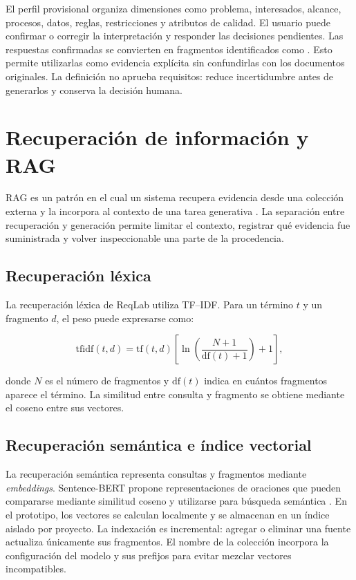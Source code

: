 El perfil provisional organiza dimensiones como problema, interesados, alcance, procesos, datos, reglas, restricciones y atributos de calidad. El usuario puede confirmar o corregir la interpretación y responder las decisiones pendientes. Las respuestas confirmadas se convierten en fragmentos identificados como . Esto permite utilizarlas como evidencia explícita sin confundirlas con los documentos originales. La definición no aprueba requisitos: reduce incertidumbre antes de generarlos y conserva la decisión humana.

\section{Recuperación de información y RAG}

RAG es un patrón en el cual un sistema recupera evidencia desde una colección externa y la incorpora al contexto de una tarea generativa \cite{lewis2020}. La separación entre recuperación y generación permite limitar el contexto, registrar qué evidencia fue suministrada y volver inspeccionable una parte de la procedencia.

\subsection{Recuperación léxica}

La recuperación léxica de ReqLab utiliza TF--IDF. Para un término \(t\) y un fragmento \(d\), el peso puede expresarse como:

\begin{equation}
  \mathrm{tfidf}(t,d)=\mathrm{tf}(t,d)
  \left[\ln\left(\frac{N+1}{\mathrm{df}(t)+1}\right)+1\right],
\end{equation}

donde \(N\) es el número de fragmentos y \(\mathrm{df}(t)\) indica en cuántos fragmentos aparece el término. La similitud entre consulta y fragmento se obtiene mediante el coseno entre sus vectores.

\subsection{Recuperación semántica e índice vectorial}

La recuperación semántica representa consultas y fragmentos mediante \emph{embeddings}. Sentence-BERT propone representaciones de oraciones que pueden compararse mediante similitud coseno y utilizarse para búsqueda semántica \cite{reimers2019}. En el prototipo, los vectores se calculan localmente y se almacenan en un índice aislado por proyecto. La indexación es incremental: agregar o eliminar una fuente actualiza únicamente sus fragmentos. El nombre de la colección incorpora la configuración del modelo y sus prefijos para evitar mezclar vectores incompatibles.

